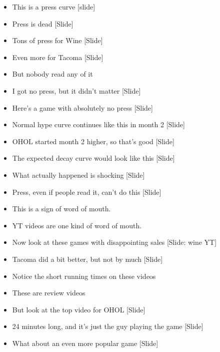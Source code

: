 \documentclass[12pt]{article}
\begin{document}
{\begin{itemize}
\item This is a press curve [slide]

\item Press is dead [Slide]

\item Tons of press for Wine [Slide]

\item Even more for Tacoma [Slide]

\item But nobody read any of it

\item I got no press, but it didn't matter [Slide]

\item Here's a game with absolutely no press [Slide]

\item Normal hype curve continues like this in month 2 [Slide]

\item OHOL started month 2 higher, so that's good [Slide]

\item The expected decay curve would look like this [Slide]

\item What actually happened is shocking [Slide]

\item Press, even if people read it, can't do this [Slide]

\item This is a sign of word of mouth.

\item YT videos are one kind of word of mouth.

\item Now look at these games with disappointing sales [Slide:  wine YT]

\item Tacoma did a bit better, but not by much [Slide]

\item Notice the short running times on these videos

\item These are review videos

\item But look at the top video for OHOL [Slide]

\item 24 minutes long, and it's just the guy playing the game [Slide]

\item What about an even more popular game [Slide]


\end{itemize}}
\end{document}
